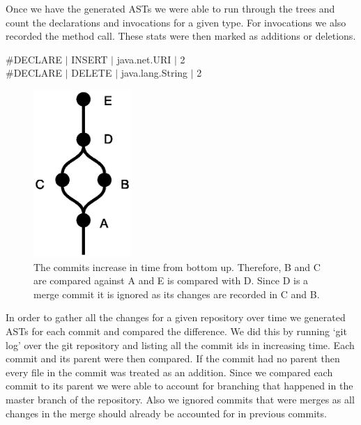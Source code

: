 \documentclass[conference]{IEEEtran}
\begin{document}
Once we have the generated ASTs we were able to run through the trees and count the declarations and invocations for a given type. For invocations we also recorded the method call. These stats were then marked as additions or deletions. 
\\
\begin{adjustwidth}{2.5em}{0pt}
\#DECLARE $\vert$ INSERT $\vert$ java.net.URI $\vert$ 2 \\
\#DECLARE $\vert$ DELETE $\vert$ java.lang.String $\vert$ 2 \\
\end{adjustwidth}

\begin{figure}[!h]
\centering
\includegraphics[height=2.5in]{commits_view}
\caption{The commits increase in time from bottom up. Therefore, B and C are compared against A and E is compared with D. Since D is a merge commit it is ignored as its changes are recorded in C and B.}
\end{figure}

In order to gather all the changes for a given repository over time we generated ASTs for each commit and compared the difference. We did this by running ‘git log’ over the git repository and listing all the commit ids in increasing time. Each commit and its parent were then compared. If the commit had no parent then every file in the commit was treated as an addition. Since we compared each commit to its parent we were able to account for branching that happened in the master branch of the repository. Also we ignored commits that were merges as all changes in the merge should already be accounted for in previous commits.
\end{document}
